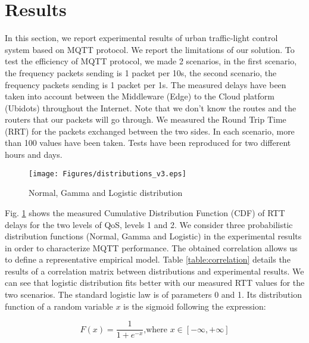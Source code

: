 \section{Results} \label{sec:Results}

In this section, we report experimental results of urban traffic-light control system based on MQTT protocol. We report the limitations of our solution. To test the efficiency of MQTT protocol, we made 2 scenarios, in the first scenario, the frequency  packets sending  is 1 packet per 10s, the second scenario, the frequency  packets sending  is 1 packet per 1s. The measured delays have been taken into account between the Middleware (Edge) to the Cloud platform (Ubidots) throughout the Internet. Note that we don't know the routes and the routers that our packets will go through. We measured the Round Trip Time (RRT) for the packets exchanged between the two sides. In each scenario, more than 100 values have been taken. Tests have been reproduced for two different hours and days.

\begin{figure}[!htb]
\centering
\texttt{[image: Figures/distributions\_v3.eps]}
\caption{Normal, Gamma and Logistic distribution}
\label{fig:cdf_distribution.pdf}
\end{figure}

Fig. \ref{fig:cdf_distribution.pdf} shows the measured Cumulative Distribution Function (CDF) of RTT delays for the two levels of QoS, levels 1 and 2. We consider three probabilistic distribution functions (Normal, Gamma and Logistic) in the experimental results in order to characterize MQTT performance. The obtained correlation allows us to define a representative empirical model. Table \ref{table:correlation} details the results of a correlation matrix between distributions and experimental results. We can see that logistic distribution \cite{STEPHENS1979} fits better with our measured RTT values for the two scenarios. The standard logistic law is of parameters 0 and 1. Its distribution function of a random variable $x$ is the sigmoid following the expression:

\begin{equation}
F(x) = \frac{1}{1 + e^{-x}} \mbox{,where } x\in \left[ -\infty, +\infty\right]
\end{equation}




